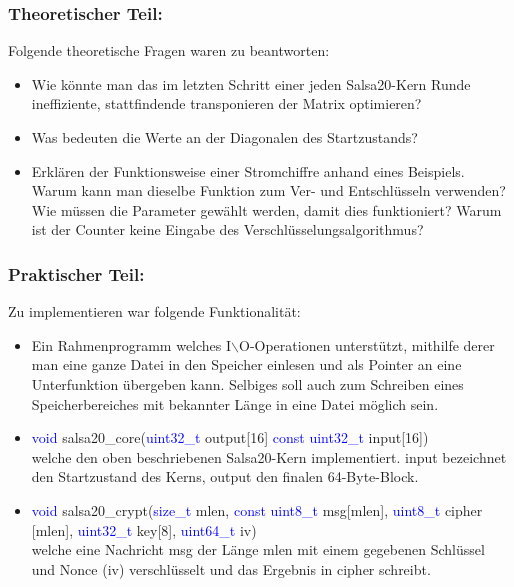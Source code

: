 \documentclass[course=erap]{aspdoc}
\begin{document}
\subsubsection{Theoretischer Teil:}
Folgende theoretische Fragen waren zu beantworten:
\begin{itemize}
    \item Wie könnte man das im letzten Schritt einer jeden Salsa20-Kern Runde ineffiziente, stattfindende transponieren der Matrix optimieren?
    \item Was bedeuten die Werte an der Diagonalen des Startzustands?
    \item Erklären der Funktionsweise einer Stromchiffre anhand eines Beispiels. Warum kann man dieselbe Funktion zum Ver- und Entschlüsseln verwenden? Wie müssen die Parameter gewählt werden, damit dies funktioniert? Warum ist der Counter keine Eingabe des Verschlüsselungsalgorithmus?
\end{itemize}
\subsubsection{Praktischer Teil:}
Zu implementieren  war folgende Funktionalität: 
\begin{itemize}
    \item Ein Rahmenprogramm welches I$\backslash$O-Operationen unterstützt, mithilfe derer man eine ganze Datei in den Speicher einlesen und als Pointer an eine Unterfunktion übergeben kann. Selbiges soll auch zum Schreiben eines Speicherbereiches mit bekannter Länge in eine Datei möglich sein.
    \item \textcolor{blue}{void} salsa20\_core(\textcolor{blue} {uint32\_t} output[16] \textcolor{blue}{const uint32\_t} input[16]) \\
    welche den oben beschriebenen Salsa20-Kern implementiert. input bezeichnet den Startzustand des Kerns, output den finalen 64-Byte-Block. \\
    \item \textcolor{blue} {void} salsa20\_crypt(\textcolor{blue}{size\_t} mlen, \textcolor {blue} {const uint8\_t} msg[mlen], \textcolor{blue}{uint8\_t} cipher [mlen], \textcolor{blue}{uint32\_t} key[8], \textcolor {blue} {uint64\_t} iv) \\
    welche eine Nachricht msg der Länge mlen mit einem gegebenen Schlüssel und Nonce (iv) verschlüsselt und das Ergebnis in cipher schreibt.
\end{itemize}
\end{document}
